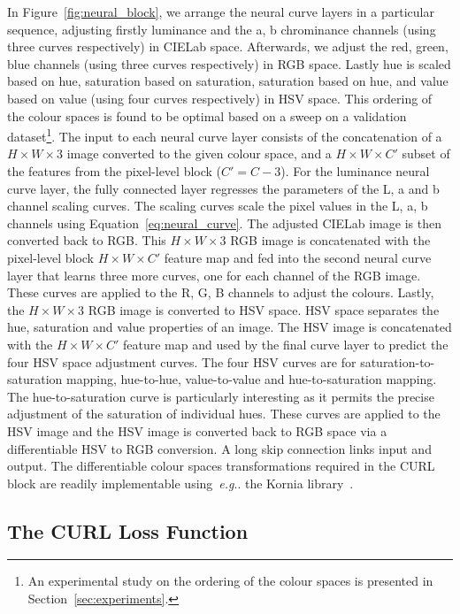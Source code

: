\documentclass[a4paper,conference]{IEEEtran}
\makeatletter
\DeclareRobustCommand\onedot{\futurelet\@let@token\@onedot} \def\@onedot{\ifx\@let@token.\else.\null\fi\xspace}
\def\eg{\emph{e.g}\onedot} \def\Eg{\emph{E.g}\onedot}
\makeatother
\begin{document}
In Figure~\ref{fig:neural_block}, we arrange the neural curve layers in a particular sequence, adjusting firstly luminance and the a, b chrominance channels (using three curves respectively) in CIELab space. Afterwards, we adjust the red, green, blue channels (using three curves respectively) in RGB space. Lastly hue is scaled based on hue, saturation based on saturation, saturation based on hue, and value based on value (using four curves respectively) in HSV space. This ordering of the colour spaces is found to be optimal based on a sweep on a validation dataset\footnote{An experimental study on the ordering of the colour spaces is presented in Section~\ref{sec:experiments}.}. The input to each neural curve layer consists of the concatenation of a $H{\times}W{\times}3$ image converted to the given colour space, and a $H{\times}W{\times}C'$ subset of the features from the pixel-level block ($C'{=}C{-}3$). For the luminance neural curve layer, the fully connected layer regresses the parameters of the L, a and b channel scaling curves. The scaling curves scale the pixel values in the L, a, b channels using Equation~\ref{eq:neural_curve}. The adjusted CIELab image is then converted back to RGB. This $H{\times}W{ \times}3$ RGB image is concatenated with the pixel-level block $H{\times}W{\times}C'$ feature map and fed into the second neural curve layer that learns three more curves, one for each channel of the RGB image. These curves are applied to the R, G, B channels to adjust the colours. Lastly, the $H{\times}W{\times}3$ RGB image is converted to HSV space. HSV space separates the hue, saturation and value properties of an image. The HSV image is concatenated with the $H{\times}W{\times}C'$ feature map and used by the final curve layer to predict the four HSV space adjustment curves. The four HSV curves are for saturation-to-saturation mapping, hue-to-hue, value-to-value and hue-to-saturation mapping. The hue-to-saturation curve is particularly interesting as it permits the precise adjustment of the saturation of individual hues. These curves are applied to the HSV image and the HSV image is converted back to RGB space via a differentiable HSV to RGB conversion. A long skip connection links input and output. The differentiable colour spaces transformations required in the CURL block are readily implementable using~\eg the Kornia library~\cite{Riba_2020_WACV}.

\subsection{The CURL Loss Function}\label{sec:loss}
\end{document}
